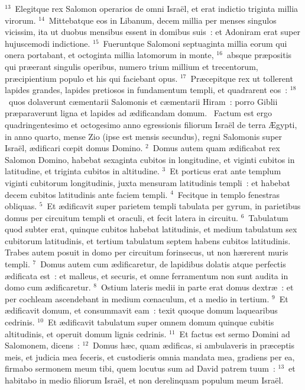 ${}^{13}$~Elegitque rex Salomon operarios de omni Isra\"el, et erat indictio triginta millia virorum.
${}^{14}$~Mittebatque eos in Libanum, decem millia per menses singulos vicissim, ita ut duobus mensibus essent in domibus suis~: et Adoniram erat super hujuscemodi indictione.
${}^{15}$~Fueruntque Salomoni septuaginta millia eorum qui onera portabant, et octoginta millia latomorum in monte,
${}^{16}$~absque pr\ae positis qui pr\ae erant singulis operibus, numero trium millium et trecentorum, pr\ae cipientium populo et his qui faciebant opus.
${}^{17}$~Pr\ae cepitque rex ut tollerent lapides grandes, lapides pretiosos in fundamentum templi, et quadrarent eos~:
${}^{18}$~quos dolaverunt c\ae mentarii Salomonis et c\ae mentarii Hiram~: porro Giblii pr\ae paraverunt ligna et lapides ad \ae dificandam domum.
~\lettrine[lines=10,image=true,loversize=0.05,lraise=-0.03]{F}{}actum est ergo quadringentesimo et octogesimo anno egressionis filiorum Isra\"el de terra \AE gypti, in anno quarto, mense Zio (ipse est mensis secundus), regni Salomonis super Isra\"el, \ae dificari cœpit domus Domino.
${}^{2}$~Domus autem quam \ae dificabat rex Salomon Domino, habebat sexaginta cubitos in longitudine, et viginti cubitos in latitudine, et triginta cubitos in altitudine.
${}^{3}$~Et porticus erat ante templum viginti cubitorum longitudinis, juxta mensuram latitudinis templi~: et habebat decem cubitos latitudinis ante faciem templi.
${}^{4}$~Fecitque in templo fenestras obliquas.
${}^{5}$~Et \ae dificavit super parietem templi tabulata per gyrum, in parietibus domus per circuitum templi et oraculi, et fecit latera in circuitu.
${}^{6}$~Tabulatum quod subter erat, quinque cubitos habebat latitudinis, et medium tabulatum sex cubitorum latitudinis, et tertium tabulatum septem habens cubitos latitudinis. Trabes autem posuit in domo per circuitum forinsecus, ut non h\ae rerent muris templi.
${}^{7}$~Domus autem cum \ae dificaretur, de lapidibus dolatis atque perfectis \ae dificata est~: et malleus, et securis, et omne ferramentum non sunt audita in domo cum \ae dificaretur.
${}^{8}$~Ostium lateris medii in parte erat domus dextr\ae~: et per cochleam ascendebant in medium cœnaculum, et a medio in tertium.
${}^{9}$~Et \ae dificavit domum, et consummavit eam~: texit quoque domum laquearibus cedrinis.
${}^{10}$~Et \ae dificavit tabulatum super omnem domum quinque cubitis altitudinis, et operuit domum lignis cedrinis.
${}^{11}$~Et factus est sermo Domini ad Salomonem, dicens~:
${}^{12}$~Domus h\ae c, quam \ae dificas, si ambulaveris in pr\ae ceptis meis, et judicia mea feceris, et custodieris omnia mandata mea, gradiens per ea, firmabo sermonem meum tibi, quem locutus sum ad David patrem tuum~:
${}^{13}$~et habitabo in medio filiorum Isra\"el, et non derelinquam populum meum Isra\"el.


